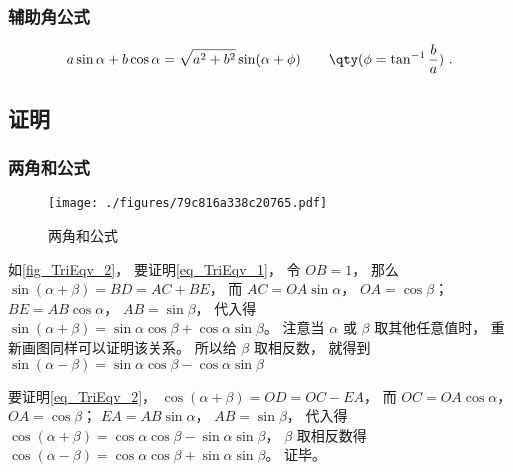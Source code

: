 \subsubsection{辅助角公式}
\begin{equation}
a\sin \alpha + b\cos \alpha = \sqrt{a^2+b^2}\sin(\alpha + \phi) \qquad \qty(\phi = \tan^{-1}\frac{b}{a})~.
\end{equation}

\subsection{证明}\label{sub_TriEqv_1}
\subsubsection{两角和公式}
\begin{figure}[ht]
\centering
\texttt{[image: ./figures/79c816a338c20765.pdf]}
\caption{两角和公式} \label{fig_TriEqv_2}
\end{figure}
如\autoref{fig_TriEqv_2}， 要证明\autoref{eq_TriEqv_1}， 令 $OB = 1$， 那么 $\sin(\alpha+\beta) = BD = AC + BE$， 而 $AC = OA \sin\alpha$， $OA = \cos\beta$； $BE = AB\cos\alpha$， $AB = \sin\beta$， 代入得 $\sin(\alpha+\beta) = \sin\alpha\cos\beta + \cos\alpha\sin\beta$。 注意当 $\alpha$ 或 $\beta$ 取其他任意值时， 重新画图同样可以证明该关系。 所以给 $\beta$ 取相反数， 就得到 $\sin(\alpha-\beta) = \sin\alpha\cos\beta - \cos\alpha\sin\beta$

要证明\autoref{eq_TriEqv_2}， $\cos(\alpha+\beta) = OD = OC - EA$， 而 $OC = OA\cos\alpha$， $OA = \cos\beta$； $EA = AB\sin\alpha$， $AB = \sin\beta$， 代入得 $\cos(\alpha+\beta) = \cos\alpha\cos\beta - \sin\alpha\sin\beta$， $\beta$ 取相反数得 $\cos(\alpha-\beta) = \cos\alpha\cos\beta + \sin\alpha\sin\beta$。 证毕。


